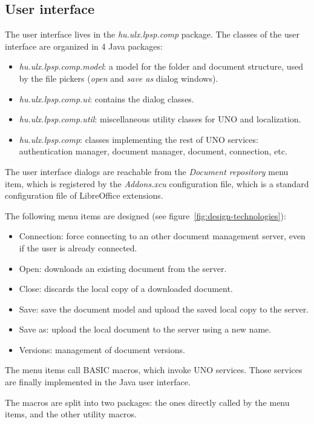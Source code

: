 \subsection{User interface}

The user interface lives in the \emph{hu.ulx.lpsp.comp} package. The classes of
the user interface are organized in 4 Java packages:

\begin{itemize}
\item \emph{hu.ulx.lpsp.comp.model}: a model for the folder and document
structure, used by the file pickers (\emph{open} and \emph{save as} dialog
windows).
\item \emph{hu.ulx.lpsp.comp.ui}: contains the dialog classes.
\item \emph{hu.ulx.lpsp.comp.util}: miscellaneous utility classes for UNO and localization.
\item \emph{hu.ulx.lpsp.comp}: classes implementing the rest of UNO
services: authentication manager, document manager, document, connection, etc.
\end{itemize}

The user interface dialogs are reachable from the \emph{Document repository}
menu item, which is registered by the \emph{Addons.xcu} configuration file,
which is a standard configuration file of LibreOffice extensions.

The following menu items are designed (see figure~\ref{fig:design-technologies}):

\begin{itemize}
\item Connection: force connecting to an other document management server, even
if the user is already connected.
\item Open: downloads an existing document from the server.
\item Close: discards the local copy of a downloaded document.
\item Save: save the document model and upload the saved local copy to the server.
\item Save as: upload the local document to the server using a new name.
\item Versions: management of document versions.
\end{itemize}

The menu items call BASIC macros, which invoke UNO services. Those services are
finally implemented in the Java user interface.

The macros are split into two packages: the ones directly called by the menu
items, and the other utility macros.

